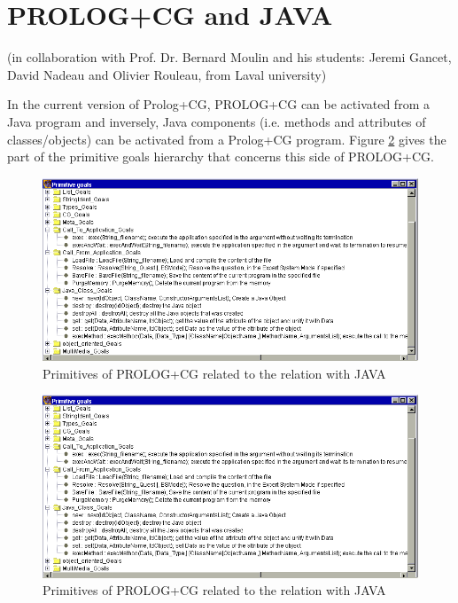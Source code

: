 \documentclass{book}
\begin{document}
\section{PROLOG+CG and JAVA}\label{Sec:PPCGAndJava}

(in collaboration with Prof. Dr. Bernard Moulin and his students:
Jeremi Gancet, David Nadeau and Olivier Rouleau, from Laval
university)

In the current version of Prolog+CG, PROLOG+CG can be activated from a
Java program and inversely, Java components (i.e. methods and
attributes of classes/objects) can be activated from a Prolog+CG
program. Figure \ref{EnvPrimHier4} gives the part of the primitive
goals hierarchy that concerns this side of PROLOG+CG.



\begin{latexonly}

\begin{figure}
\begin{center}
\includegraphics[scale=0.4]{EnvPrimHier4.png}
\end{center}
\caption{\label{EnvPrimHier4}Primitives of PROLOG+CG related to the
relation with JAVA}
\end{figure}

\end{latexonly}

\begin{htmlonly}

\begin{figure}
\begin{center}
\includegraphics{EnvPrimHier4.png}
\end{center}
\caption{\label{EnvPrimHier4}Primitives of PROLOG+CG related to the
relation with JAVA}
\end{figure}

\end{htmlonly}
\end{document}
